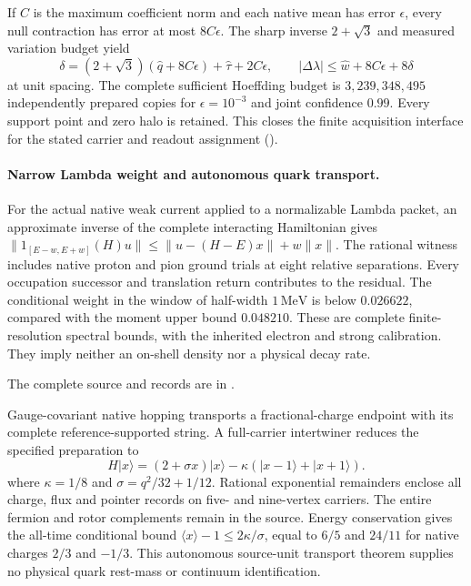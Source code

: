 If $C$ is the maximum coefficient norm and each native mean has error
$\epsilon$, every null contraction has error at most $8C\epsilon$.
The sharp inverse $2+\sqrt3$ and measured variation budget yield
\[
 \delta=(2+\sqrt3)(\widehat q+8C\epsilon)
        +\widehat\tau+2C\epsilon,\qquad
 |\Delta\lambda|\le\widehat w+8C\epsilon+8\delta
\]
at unit spacing. The complete sufficient Hoeffding budget is
$3{,}239{,}348{,}495$ independently prepared copies for $\epsilon=10^{-3}$
and joint confidence $0.99$. Every support point and zero halo is retained.
This closes the finite acquisition interface for the stated carrier and
readout assignment ().

\paragraph{Narrow Lambda weight and autonomous quark transport.}
For the actual native weak current applied to a normalizable Lambda packet,
an approximate inverse of the complete interacting Hamiltonian gives
\(\|1_{[E-w,E+w]}(H)u\|\leq\|u-(H-E)x\|+w\|x\|\).
The rational witness includes native proton and pion ground trials at eight
relative separations. Every occupation successor and translation return
contributes to the residual. The conditional weight in the window of
half-width \(1\,\mathrm{MeV}\) is below \(0.026622\), compared with the
moment upper bound \(0.048210\). These are complete finite-resolution
spectral bounds, with the inherited electron and strong calibration.
They imply neither an on-shell density nor a physical decay rate.

The complete source and records are in .

Gauge-covariant native hopping transports a fractional-charge endpoint with
its complete reference-supported string. A full-carrier intertwiner reduces
the specified preparation to
\[H|x\rangle=(2+\sigma x)|x\rangle-\kappa(|x-1\rangle+|x+1\rangle).\]
where \(\kappa=1/8\) and \(\sigma=q^2/32+1/12\).
Rational exponential remainders enclose all charge, flux and pointer records
on five- and nine-vertex carriers. The entire fermion and rotor complements
remain in the source. Energy conservation gives the all-time conditional
bound \(\langle x\rangle-1\leq2\kappa/\sigma\), equal to \(6/5\) and
\(24/11\) for native charges \(2/3\) and \(-1/3\).
This autonomous source-unit transport theorem supplies no physical quark
rest-mass or continuum identification.

